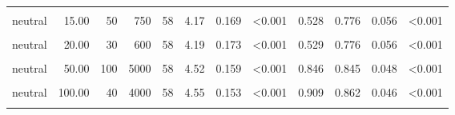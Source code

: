 \documentclass[
]{article}
\begin{document}
\begin{longtable}[t]{lrrrrrrlrrrl}
\hspace{1em}\cellcolor{gray!10}{neutral} & \cellcolor{gray!10}{15.00} & \cellcolor{gray!10}{20} & \cellcolor{gray!10}{300} & \cellcolor{gray!10}{58} & \cellcolor{gray!10}{4.02} & \cellcolor{gray!10}{0.196} & \cellcolor{gray!10}{0.010} & \cellcolor{gray!10}{0.349} & \cellcolor{gray!10}{0.690} & \cellcolor{gray!10}{0.062} & \cellcolor{gray!10}{0.005}\\
\hspace{1em}neutral & 15.00 & 50 & 750 & 58 & 4.17 & 0.169 & <0.001 & 0.528 & 0.776 & 0.056 & <0.001\\
\hspace{1em}\cellcolor{gray!10}{neutral} & \cellcolor{gray!10}{20.00} & \cellcolor{gray!10}{10} & \cellcolor{gray!10}{200} & \cellcolor{gray!10}{58} & \cellcolor{gray!10}{4.17} & \cellcolor{gray!10}{0.188} & \cellcolor{gray!10}{<0.001} & \cellcolor{gray!10}{0.475} & \cellcolor{gray!10}{0.759} & \cellcolor{gray!10}{0.057} & \cellcolor{gray!10}{<0.001}\\
\hspace{1em}neutral & 20.00 & 30 & 600 & 58 & 4.19 & 0.173 & <0.001 & 0.529 & 0.776 & 0.056 & <0.001\\
\hspace{1em}\cellcolor{gray!10}{neutral} & \cellcolor{gray!10}{50.00} & \cellcolor{gray!10}{10} & \cellcolor{gray!10}{500} & \cellcolor{gray!10}{58} & \cellcolor{gray!10}{4.53} & \cellcolor{gray!10}{0.178} & \cellcolor{gray!10}{<0.001} & \cellcolor{gray!10}{0.772} & \cellcolor{gray!10}{0.828} & \cellcolor{gray!10}{0.050} & \cellcolor{gray!10}{<0.001}\\
\hspace{1em}neutral & 50.00 & 100 & 5000 & 58 & 4.52 & 0.159 & <0.001 & 0.846 & 0.845 & 0.048 & <0.001\\
\hspace{1em}\cellcolor{gray!10}{neutral} & \cellcolor{gray!10}{100.00} & \cellcolor{gray!10}{30} & \cellcolor{gray!10}{3000} & \cellcolor{gray!10}{58} & \cellcolor{gray!10}{4.52} & \cellcolor{gray!10}{0.172} & \cellcolor{gray!10}{<0.001} & \cellcolor{gray!10}{0.782} & \cellcolor{gray!10}{0.741} & \cellcolor{gray!10}{0.059} & \cellcolor{gray!10}{<0.001}\\
\hspace{1em}neutral & 100.00 & 40 & 4000 & 58 & 4.55 & 0.153 & <0.001 & 0.909 & 0.862 & 0.046 & <0.001\\
\hspace{1em}\cellcolor{gray!10}{neutral} & \cellcolor{gray!10}{500.00} & \cellcolor{gray!10}{10} & \cellcolor{gray!10}{5000} & \cellcolor{gray!10}{58} & \cellcolor{gray!10}{4.91} & \cellcolor{gray!10}{0.161} & \cellcolor{gray!10}{<0.001} & \cellcolor{gray!10}{1.161} & \cellcolor{gray!10}{0.879} & \cellcolor{gray!10}{0.044} & \cellcolor{gray!10}{<0.001}\\

\end{longtable}
\end{document}
